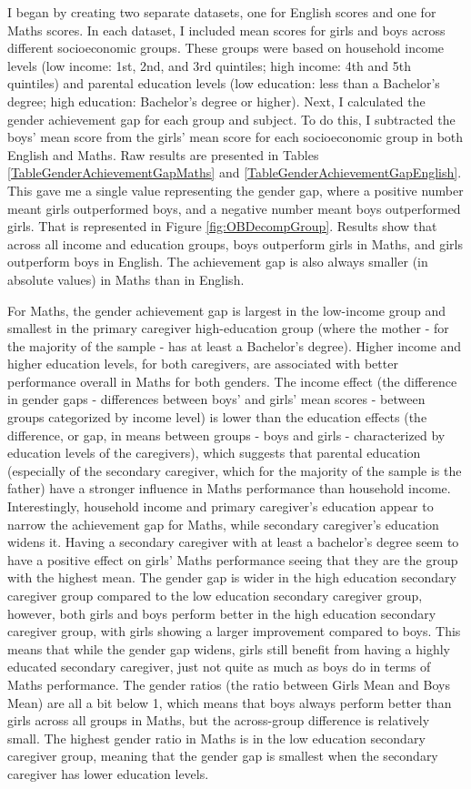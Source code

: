 \documentclass[12pt,a4paper,onecolumn]{article}
\numberwithin{equation}{section}
\begin{document}
I began by creating two separate datasets, one for English scores and one for Maths scores. In each dataset, I included mean scores for girls and boys across different socioeconomic groups. These groups were based on household income levels (low income: 1st, 2nd, and 3rd quintiles; high income: 4th and 5th quintiles) and parental education levels (low education: less than a Bachelor's degree; high education: Bachelor's degree or higher). Next, I calculated the gender achievement gap for each group and subject. To do this, I subtracted the boys' mean score from the girls' mean score for each socioeconomic group in both English and Maths. Raw results are presented in Tables \ref{TableGenderAchievementGapMaths} and \ref{TableGenderAchievementGapEnglish}. This gave me a single value representing the gender gap, where a positive number meant girls outperformed boys, and a negative number meant boys outperformed girls. That is represented in Figure \ref{fig:OBDecompGroup}. Results show that across all income and education groups, boys outperform girls in Maths, and girls outperform boys in English. The achievement gap is also always smaller (in absolute values) in Maths than in English. 

For Maths, the gender achievement gap is largest in the low-income group and smallest in the primary caregiver high-education group (where the mother - for the majority of the sample - has at least a Bachelor's degree). Higher income and higher education levels, for both caregivers, are associated with better performance overall in Maths for both genders. The income effect (the difference in gender gaps - differences between boys' and girls' mean scores - between groups categorized by income level) is lower than the education effects (the difference, or gap, in means between groups - boys and girls - characterized by education levels of the caregivers), which suggests that parental education (especially of the secondary caregiver, which for the majority of the sample is the father) have a stronger influence in Maths performance than household income. Interestingly, household income and primary caregiver's education appear to narrow the achievement gap for Maths, while secondary caregiver's education widens it. Having a secondary caregiver with at least a bachelor's degree seem to have a positive effect on girls' Maths performance seeing that they are the group with the highest mean. The gender gap is wider in the high education secondary caregiver group compared to the low education secondary caregiver group, however, both girls and boys perform better in the high education secondary caregiver group, with girls showing a larger improvement compared to boys. This means that while the gender gap widens, girls still benefit from having a highly educated secondary caregiver, just not quite as much as boys do in terms of Maths performance. The gender ratios (the ratio between Girls Mean and Boys Mean) are all a bit below 1, which means that boys always perform better than girls across all groups in Maths, but the across-group difference is relatively small. The highest gender ratio in Maths is in the low education secondary caregiver group, meaning that the gender gap is smallest when the secondary caregiver has lower education levels. 
\end{document}

